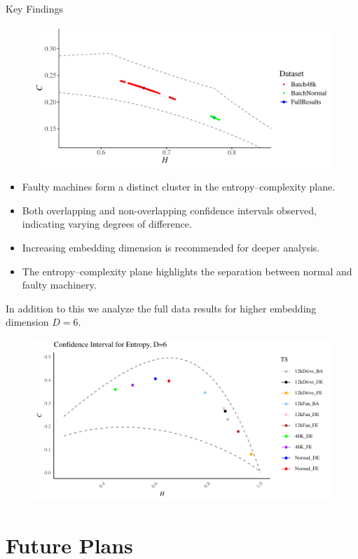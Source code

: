 \documentclass{beamer}
\begin{document}
\begin{frame}{Key Findings}
	\begin{figure}[hbt]
	\centering
	\includegraphics[width=0.6 \textwidth]{confidence_interval}
	\label{fig:EntopyComplexity Plane}
\end{figure}
	\begin{itemize}
		\item Faulty machines form a distinct cluster in the entropy–complexity plane.
		\item Both overlapping and non-overlapping confidence intervals observed, indicating varying degrees of difference.
		\item Increasing embedding dimension is recommended for deeper analysis.
		\item The entropy–complexity plane highlights the separation between normal and faulty machinery.
	\end{itemize}
\end{frame}

\begin{frame}
	In addition to this we analyze the full data results for higher embedding dimension $D=6$.
		\begin{figure}[hbt]
		\centering
		\includegraphics[width=0.8 \textwidth]{Confidence Interval}
		\label{fig:EntopyComplexity Plane D=6}
	\end{figure}
\end{frame}


\section{Future Plans}
\end{document}
